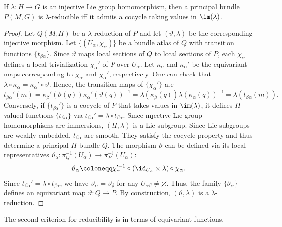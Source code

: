 \begin{prop}[{{\cite[Prop.~1.6.1]{RS2}}}]\label{prop 1.6.1 RS2}
    If $\lambda:H\to G$ is an injective Lie group homomorphism, then a principal bundle $P(M,G)$ is $\lambda$-reducible iff it admits a cocycle taking values in $\im(\lambda)$.
\end{prop}
\begin{proof}
    Let $Q(M,H)$ be a $\lambda$-reduction of $P$ and let $(\vartheta,\lambda)$ be the corresponding injective morphism. Let $\{(U_\alpha,\chi_\alpha)\}$ be a bundle atlas of $Q$ with transition functions $\{t_{\beta\alpha}\}$. Since $\vartheta$ maps local sections of $Q$ to local sections of $P$, each $\chi_\alpha$ defines a local trivialization $\chi_\alpha'$ of $P$ over $U_\alpha$. Let $\kappa_\alpha$ and $\kappa_\alpha'$ be the equivariant maps corresponding to $\chi_\alpha$ and $\chi_\alpha'$, respectively. One can check that $\lambda\circ\kappa_\alpha=\kappa_\alpha'\circ\vartheta$. Hence, the transition maps of $\{\chi_\alpha'\}$ are
    \[t_{\beta\alpha}'(m)=\kappa_\beta'(\vartheta(q))\kappa_\alpha'(\vartheta(q))^{-1}=\lambda(\kappa_\beta(q))\lambda(\kappa_\alpha(q))^{-1}=\lambda(t_{\beta\alpha}(m)).\]
    Conversely, if $\{t_{\beta\alpha}'\}$ is a cocycle of $P$ that takes values in $\im(\lambda)$, it defines $H$-valued functions $\{t_{\beta\alpha}\}$ via $t_{\beta\alpha}'=\lambda\circ t_{\beta\alpha}$. Since injective Lie group homomorphisms are immersions, $(H,\lambda)$ is a Lie subgroup. Since Lie subgroups are weakly embedded, $t_{\beta\alpha}$ are smooth. They satisfy the cocycle property and thus determine a principal $H$-bundle $Q$. The morphism $\vartheta$ can be defined via its local representatives $\vartheta_\alpha:\pi_Q^{-1}(U_\alpha)\to \pi_P^{-1}(U_\alpha)$:
    \[\vartheta_\alpha\coloneqq \chi_\alpha^{\prime-1}\circ(\id_{U_\alpha}\times \lambda)\circ \chi_\alpha.\]
    Since $t_{\beta\alpha}'=\lambda\circ t_{\beta\alpha}$, we have $\vartheta_\alpha=\vartheta_\beta$ for any $U_{\alpha\beta}\neq\varnothing$. Thus, the family $\{\vartheta_\alpha\}$ defines an equivariant map $\vartheta:Q\to P$. By construction, $(\vartheta,\lambda)$ is a $\lambda$-reduction.
\end{proof}

The second criterion for reducibility is in terms of equivariant functions.

